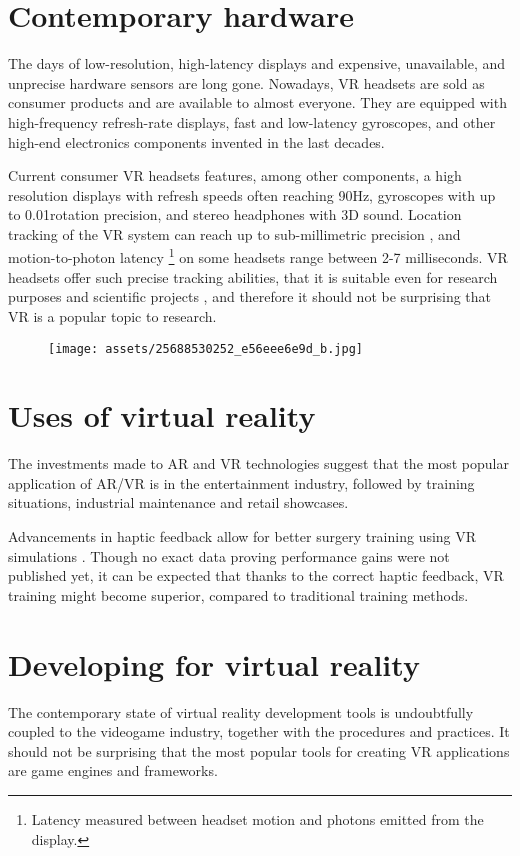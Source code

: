 \section{Contemporary hardware}
The days of low-resolution, high-latency displays and expensive, unavailable,
and unprecise hardware sensors are long gone. Nowadays, VR headsets are
sold as consumer products and are available to almost everyone. They are
equipped with high-frequency refresh-rate displays, fast and low-latency
gyroscopes, and other high-end electronics components invented in the last
decades.


Current consumer VR headsets features, among other components,
a high resolution displays with refresh speeds often reaching 90Hz, gyroscopes
with up to 0.01\degree rotation precision, and stereo headphones with 3D sound.
Location tracking of the VR system can reach up to sub-millimetric precision
\hyperlink{vivenasa}{}, and motion-to-photon latency
\footnote{Latency measured between headset motion and photons emitted from the display.}
on some headsets range between 2-7 milliseconds. \hyperlink{mtpltc}{} \hyperlink{xinwiki}{}
VR headsets offer such precise tracking abilities, that it is suitable even
for research purposes and scientific projects \hyperlink{vivepbsr}{}, and therefore
it should not be surprising that VR is a popular topic to research.


\begin{figure}[h]{}
\centering\texttt{[image: assets/25688530252\_e56eee6e9d\_b.jpg]}
\caption{}

\end{figure}

\section{Uses of virtual reality}
The investments made to AR and VR technologies suggest
that the most popular application of AR/VR is in the entertainment industry,
followed
by training situations, industrial maintenance and retail showcases.
\hyperlink{statistavr}{}


Advancements in haptic feedback allow for better surgery training using
VR simulations \hyperlink{vhfcrmisvrt}{}. Though no exact data proving performance gains
were not published yet, it can be expected that thanks to the correct haptic
feedback, VR training might become superior, compared to traditional
training methods. \hyperlink{vrsrgr}{}


\hypertarget{x-developing-for-virtual-reality}{\section{Developing for virtual reality}}
The contemporary state of virtual reality development tools is undoubtfully
coupled to the videogame industry, together with the procedures and practices.
It should not be surprising that the most popular tools for creating
VR applications are game engines and frameworks.


